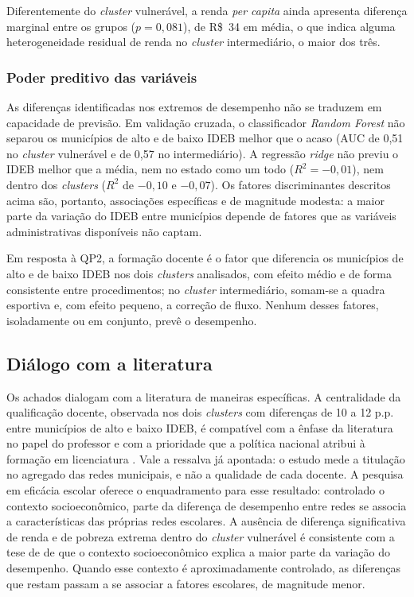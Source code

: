 Diferentemente do \textit{cluster} vulnerável, a renda \textit{per capita} ainda apresenta diferença marginal entre os grupos ($p = 0{,}081$), de R\$~34 em média, o que indica alguma heterogeneidade residual de renda no \textit{cluster} intermediário, o maior dos três.

\subsubsection{Poder preditivo das variáveis}

As diferenças identificadas nos extremos de desempenho não se traduzem em capacidade de previsão. Em validação cruzada, o classificador \textit{Random Forest} não separou os municípios de alto e de baixo IDEB melhor que o acaso (AUC de 0,51 no \textit{cluster} vulnerável e de 0,57 no intermediário). A regressão \textit{ridge} não previu o IDEB melhor que a média, nem no estado como um todo ($R^2 = -0{,}01$), nem dentro dos \textit{clusters} ($R^2$ de $-0{,}10$ e $-0{,}07$). Os fatores discriminantes descritos acima são, portanto, associações específicas e de magnitude modesta: a maior parte da variação do IDEB entre municípios depende de fatores que as variáveis administrativas disponíveis não captam.

Em resposta à QP2, a formação docente é o fator que diferencia os municípios de alto e de baixo IDEB nos dois \textit{clusters} analisados, com efeito médio e de forma consistente entre procedimentos; no \textit{cluster} intermediário, somam-se a quadra esportiva e, com efeito pequeno, a correção de fluxo. Nenhum desses fatores, isoladamente ou em conjunto, prevê o desempenho.

\subsection{Diálogo com a literatura}

Os achados dialogam com a literatura de maneiras específicas. A centralidade da qualificação docente, observada nos dois \textit{clusters} com diferenças de 10 a 12 p.p. entre municípios de alto e baixo IDEB, é compatível com a ênfase da literatura no papel do professor \citep{rivkin2005} e com a prioridade que a política nacional atribui à formação em licenciatura \citep{brasil2014, gatti2019}. Vale a ressalva já apontada: o estudo mede a titulação no agregado das redes municipais, e não a qualidade de cada docente. A pesquisa em eficácia escolar \citep{brooke2008} oferece o enquadramento para esse resultado: controlado o contexto socioeconômico, parte da diferença de desempenho entre redes se associa a características das próprias redes escolares. A ausência de diferença significativa de renda e de pobreza extrema dentro do \textit{cluster} vulnerável é consistente com a tese de \citet{coleman1966} de que o contexto socioeconômico explica a maior parte da variação do desempenho. Quando esse contexto é aproximadamente controlado, as diferenças que restam passam a se associar a fatores escolares, de magnitude menor.

